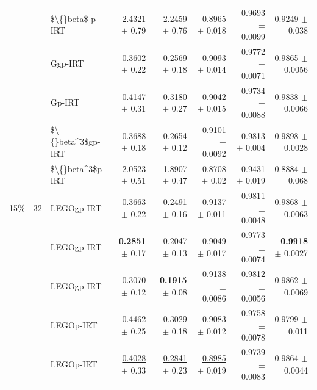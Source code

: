 \begin{longtable}{llp{}rrrrr}
 &  & \$\textbackslash\{\}beta\$ p-IRT & 2.4321 {\scriptsize $\pm$ 0.79} & 2.2459 {\scriptsize $\pm$ 0.76} & \underline{0.8965} {\scriptsize $\pm$ 0.018} & 0.9693 {\scriptsize $\pm$ 0.0099} & 0.9249 {\scriptsize $\pm$ 0.038} \\
 &  & Ggp-IRT & \underline{0.3602} {\scriptsize $\pm$ 0.22} & \underline{0.2569} {\scriptsize $\pm$ 0.18} & \underline{0.9093} {\scriptsize $\pm$ 0.014} & \underline{0.9772} {\scriptsize $\pm$ 0.0071} & \underline{0.9865} {\scriptsize $\pm$ 0.0056} \\
 &  & Gp-IRT & \underline{0.4147} {\scriptsize $\pm$ 0.31} & \underline{0.3180} {\scriptsize $\pm$ 0.27} & \underline{0.9042} {\scriptsize $\pm$ 0.015} & 0.9734 {\scriptsize $\pm$ 0.0088} & 0.9838 {\scriptsize $\pm$ 0.0066} \\
 &  & \$\textbackslash\{\}beta\textasciicircum{}3\$gp-IRT & \underline{0.3688} {\scriptsize $\pm$ 0.18} & \underline{0.2654} {\scriptsize $\pm$ 0.12} & \underline{0.9101} {\scriptsize $\pm$ 0.0092} & \underline{0.9813} {\scriptsize $\pm$ 0.004} & \underline{0.9898} {\scriptsize $\pm$ 0.0028} \\
 &  & \$\textbackslash\{\}beta\textasciicircum{}3\$p-IRT & 2.0523 {\scriptsize $\pm$ 0.51} & 1.8907 {\scriptsize $\pm$ 0.47} & 0.8708 {\scriptsize $\pm$ 0.02} & 0.9431 {\scriptsize $\pm$ 0.019} & 0.8884 {\scriptsize $\pm$ 0.068} \\
\midrule
15\% & 32 & LEGOgp-IRT & \underline{0.3663} {\scriptsize $\pm$ 0.22} & \underline{0.2491} {\scriptsize $\pm$ 0.16} & \underline{0.9137} {\scriptsize $\pm$ 0.011} & \underline{0.9811} {\scriptsize $\pm$ 0.0048} & \underline{0.9868} {\scriptsize $\pm$ 0.0063} \\
 &  & LEGOgp-IRT & \textbf{0.2851} {\scriptsize $\pm$ 0.17} & \underline{0.2047} {\scriptsize $\pm$ 0.13} & \underline{0.9049} {\scriptsize $\pm$ 0.017} & 0.9773 {\scriptsize $\pm$ 0.0074} & \textbf{0.9918} {\scriptsize $\pm$ 0.0027} \\
 &  & LEGOgp-IRT & \underline{0.3070} {\scriptsize $\pm$ 0.12} & \textbf{0.1915} {\scriptsize $\pm$ 0.08} & \underline{0.9138} {\scriptsize $\pm$ 0.0086} & \underline{0.9812} {\scriptsize $\pm$ 0.0056} & \underline{0.9862} {\scriptsize $\pm$ 0.0069} \\
 &  & LEGOp-IRT & \underline{0.4462} {\scriptsize $\pm$ 0.25} & \underline{0.3029} {\scriptsize $\pm$ 0.18} & \underline{0.9083} {\scriptsize $\pm$ 0.012} & 0.9758 {\scriptsize $\pm$ 0.0078} & 0.9799 {\scriptsize $\pm$ 0.011} \\
 &  & LEGOp-IRT & \underline{0.4028} {\scriptsize $\pm$ 0.33} & \underline{0.2841} {\scriptsize $\pm$ 0.23} & \underline{0.8985} {\scriptsize $\pm$ 0.019} & 0.9739 {\scriptsize $\pm$ 0.0083} & 0.9864 {\scriptsize $\pm$ 0.0044} \\

\end{longtable}
